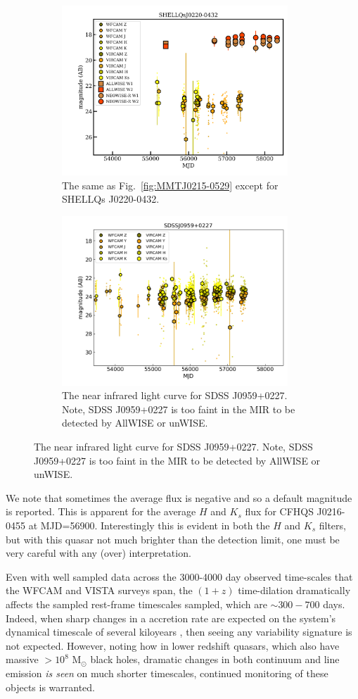 \documentclass[usenatbib]{mnras}
\begin{document}
\begin{figure}
  \begin{subfigure}{}\quad
    \centering
    \includegraphics[width=8.5cm]{../light_curves/SHELLQsJ0220-0432LC_20190613.png}
    \caption{The same as Fig.~\ref{fig:MMTJ0215-0529} except for SHELLQs J0220-0432.}
    \label{fig:SHELLQsJ0220-0432}
  \end{subfigure}
  \begin{subfigure}{}\quad
    \centering
    \includegraphics[width=8.5cm]{../light_curves/SDSSJ0959+0227LC_20190612.png}
    \caption{The near infrared light curve for SDSS J0959+0227. Note, 
      SDSS J0959+0227 is too faint in the MIR to be detected by AllWISE or unWISE.}
    \label{fig:SDSSJ0959+0227}
  \end{subfigure}
  \medskip
\end{figure}

We note that sometimes the average flux is negative and so a default
magnitude is reported.  This is apparent for the average $H$ and
$K_{s}$ flux for CFHQS J0216-0455 at MJD=56900.  Interestingly this is
evident in both the $H$ and $K_{s}$ filters, but with this quasar not
much brighter than the detection limit, one must be very careful with
any (over) interpretation.

Even with well sampled data across the 3000-4000 day observed
time-scales that the WFCAM and VISTA surveys span, the $(1+z)$
time-dilation dramatically affects the sampled rest-frame timescales
sampled, which are $\sim300-700$ days. Indeed, when sharp changes in a accretion rate are expected
on the system's dynamical timescale of several kiloyears
\citep[e.g.,][]{Regan2019}, then seeing any variability signature is
not expected. However, noting how in lower redshift quasars, which
also have massive $>10^{8}$ M$_{\odot}$ black holes, dramatic changes
in both continuum and line emission {\it is seen} on much shorter
timescales, continued monitoring of these objects is warranted.
\end{document}
